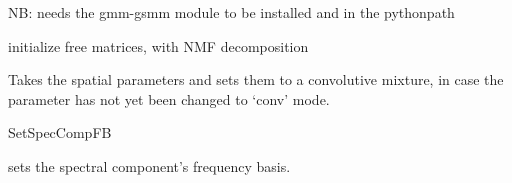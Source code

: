\documentclass[letterpaper,10pt,english]{sphinxmanual}
\begin{document}
\begin{fulllineitems}
\begin{fulllineitems}
\begin{description}
\begin{description}
\end{description}

\end{description}

NB: needs the gmm-gsmm module to be installed and in the pythonpath

\end{fulllineitems}


\begin{fulllineitems}
\label{reference/audiomodel:pyfasst.audioModel.multiChanSourceF0Filter.initializeFreeMats}
initialize free matrices, with NMF decomposition

\end{fulllineitems}


\begin{fulllineitems}
\label{reference/audiomodel:pyfasst.audioModel.multiChanSourceF0Filter.makeItConvolutive}
Takes the spatial parameters and sets them to a convolutive
mixture, in case the parameter has not yet been changed to
`conv' mode.

\end{fulllineitems}


\begin{fulllineitems}
\label{reference/audiomodel:pyfasst.audioModel.multiChanSourceF0Filter.reweigh_sparsity_constraint}
\end{fulllineitems}


\begin{fulllineitems}
\label{reference/audiomodel:pyfasst.audioModel.multiChanSourceF0Filter.setSpecCompFB}
SetSpecCompFB

sets the spectral component's frequency basis.

\end{fulllineitems}


\end{fulllineitems}
\end{document}
